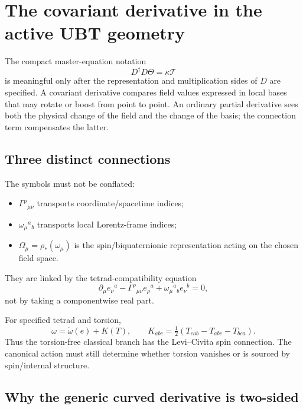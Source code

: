 
\section{The covariant derivative in the active UBT geometry}

The compact master-equation notation
\[
 D^\dagger D\Theta=\kappa\mathcal T
\]
is meaningful only after the representation and multiplication sides of $D$
are specified.  A covariant derivative compares field values expressed in
local bases that may rotate or boost from point to point.  An ordinary partial
derivative sees both the physical change of the field and the change of the
basis; the connection term compensates the latter.

\subsection{Three distinct connections}

The symbols must not be conflated:
\begin{itemize}
 \item $\Gamma^\rho{}_{\mu\nu}$ transports coordinate/spacetime indices;
 \item $\omega_\mu{}^a{}_b$ transports local Lorentz-frame indices;
 \item $\Omega_\mu=\rho_*(\omega_\mu)$ is the spin/biquaternionic
       representation acting on the chosen field space.
\end{itemize}
They are linked by the tetrad-compatibility equation
\[
 \partial_\mu e_\nu{}^a
 -\Gamma^\rho{}_{\mu\nu}e_\rho{}^a
 +\omega_\mu{}^a{}_b e_\nu{}^b=0,
\]
not by taking a componentwise real part.

For specified tetrad and torsion,
\[
 \omega=\mathring\omega(e)+K(T),
 \qquad K_{abc}=\tfrac12(T_{cab}-T_{abc}-T_{bca}).
\]
Thus the torsion-free classical branch has the Levi--Civita spin connection.
The canonical action must still determine whether torsion vanishes or is
sourced by spin/internal structure.

\subsection{Why the generic curved derivative is two-sided}


